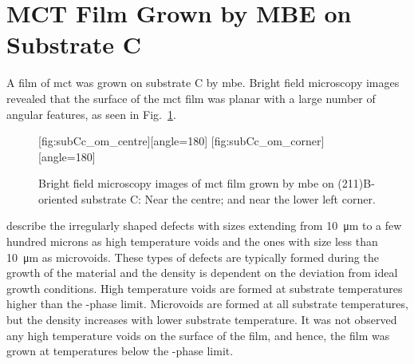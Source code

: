 \clearpage
\section{MCT Film Grown by MBE on  Substrate C}\label{sec:subCc}

A film of \acl{mct} was grown on substrate C by \ac{mbe}. Bright field microscopy images revealed that the surface of the \ac{mct} film was planar with a large number of angular features, as seen in Fig.~\ref{fig:subCc_om}.

\begin{figure}[htbp]
    \centering
    [fig:subCc_om_centre][angle=180]
    \hfill
    [fig:subCc_om_corner][angle=180]
    \caption[Bright field microscopy images of \ac{mct} film grown by \ac{mbe} on substrate C.]{Bright field microscopy images of \ac{mct} film grown by \ac{mbe} on (211)B-oriented substrate C:  Near the centre; and  near the lower left corner.}
    \label{fig:subCc_om}
\end{figure}

\citet{selvig2007defects} describe the irregularly shaped defects with sizes extending from \SI{10}{\micro\metre} to a few hundred microns as high temperature voids and the ones with size less than \SI{10}{\micro\metre} as microvoids. These types of defects are typically formed during the growth of the material and the density is dependent on the deviation from ideal growth conditions. High temperature voids are formed at substrate temperatures higher than the -phase limit. Microvoids are formed at all substrate temperatures, but the density increases with lower substrate temperature. It was not observed any high temperature voids on the surface of the film, and hence, the film was grown at temperatures below the -phase limit.


